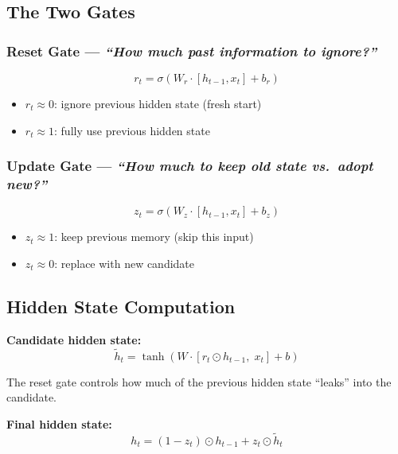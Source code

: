 \documentclass[11pt,a4paper]{article}
\begin{document}
\subsection{The Two Gates}

\subsubsection*{Reset Gate --- \textit{``How much past information to ignore?''}}

\begin{equation}
r_t = \sigma(W_r \cdot [h_{t-1}, x_t] + b_r)
\end{equation}

\begin{itemize}[leftmargin=1.5em]
    \item $r_t \approx 0$: ignore previous hidden state (fresh start)
    \item $r_t \approx 1$: fully use previous hidden state
\end{itemize}

\subsubsection*{Update Gate --- \textit{``How much to keep old state vs.\ adopt new?''}}

\begin{equation}
z_t = \sigma(W_z \cdot [h_{t-1}, x_t] + b_z)
\end{equation}

\begin{itemize}[leftmargin=1.5em]
    \item $z_t \approx 1$: keep previous memory (skip this input)
    \item $z_t \approx 0$: replace with new candidate
\end{itemize}

\subsection{Hidden State Computation}

\textbf{Candidate hidden state:}
\begin{equation}
\tilde{h}_t = \tanh(W \cdot [r_t \odot h_{t-1},\; x_t] + b)
\end{equation}

The reset gate controls how much of the previous hidden state ``leaks'' into the candidate.

\textbf{Final hidden state:}
\begin{equation}
\boxed{h_t = (1 - z_t) \odot h_{t-1} + z_t \odot \tilde{h}_t}
\end{equation}
\end{document}
